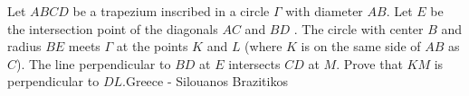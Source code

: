 Let $ABCD$ be a trapezium inscribed in a circle $\Gamma$ with diameter $AB$. Let $E$ be the intersection point of the diagonals $AC$ and $BD$ . The circle with center $B$ and radius $BE$ meets $\Gamma$ at the points $K$ and $L$ (where $K$ is on the same side of $AB$ as $C$). The line perpendicular to $BD$ at $E$ intersects $CD$ at $M$. Prove that $KM$ is perpendicular to $DL$.Greece - Silouanos Brazitikos